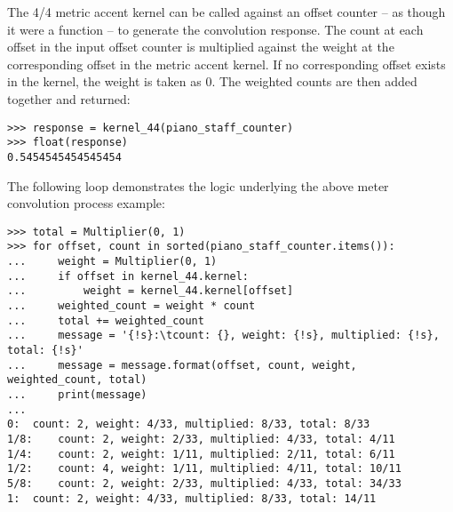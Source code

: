\noindent The 4/4 metric accent kernel can be called against an offset counter
-- as though it were a function -- to generate the convolution response. The
count at each offset in the input offset counter is multiplied against the
weight at the corresponding offset in the metric accent kernel. If no
corresponding offset exists in the kernel, the weight is taken as 0. The
weighted counts are then added together and returned:

\begin{comment}
<abjad>
response = kernel_44(piano_staff_counter)
float(response)
</abjad>
\end{comment}

\begin{singlespacing}
\vspace{-0.5\baselineskip}
\begin{lstlisting}
>>> response = kernel_44(piano_staff_counter)
>>> float(response)
0.5454545454545454
\end{lstlisting}
\end{singlespacing}

\noindent The following loop demonstrates the logic underlying the above meter
convolution process example:

\begin{comment}
<abjad>
total = Multiplier(0, 1)
for offset, count in sorted(piano_staff_counter.items()):
    weight = Multiplier(0, 1)
    if offset in kernel_44.kernel:
        weight = kernel_44.kernel[offset]
    weighted_count = weight * count
    total += weighted_count
    message = '{!s}:\tcount: {}, weight: {!s}, multiplied: {!s}, total: {!s}'
    message = message.format(offset, count, weight, weighted_count, total)
    print(message)

</abjad>
\end{comment}

\begin{singlespacing}
\vspace{-0.5\baselineskip}
\begin{lstlisting}
>>> total = Multiplier(0, 1)
>>> for offset, count in sorted(piano_staff_counter.items()):
...     weight = Multiplier(0, 1)
...     if offset in kernel_44.kernel:
...         weight = kernel_44.kernel[offset]
...     weighted_count = weight * count
...     total += weighted_count
...     message = '{!s}:\tcount: {}, weight: {!s}, multiplied: {!s}, total: {!s}'
...     message = message.format(offset, count, weight, weighted_count, total)
...     print(message)
...
0:	count: 2, weight: 4/33, multiplied: 8/33, total: 8/33
1/8:	count: 2, weight: 2/33, multiplied: 4/33, total: 4/11
1/4:	count: 2, weight: 1/11, multiplied: 2/11, total: 6/11
1/2:	count: 4, weight: 1/11, multiplied: 4/11, total: 10/11
5/8:	count: 2, weight: 2/33, multiplied: 4/33, total: 34/33
1:	count: 2, weight: 4/33, multiplied: 8/33, total: 14/11
\end{lstlisting}
\end{singlespacing}

